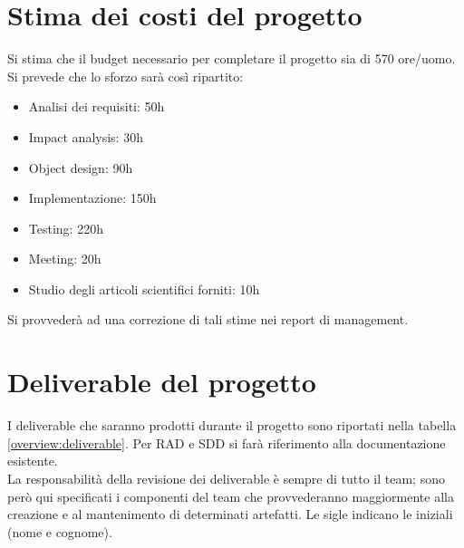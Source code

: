 \section{Stima dei costi del progetto}
Si stima che il budget necessario per completare il progetto sia di 570 ore/uomo. Si prevede che lo sforzo sarà così ripartito:\\
\begin{itemize}
\item Analisi dei requisiti: 50h
\item Impact analysis: 30h
\item Object design: 90h
\item Implementazione: 150h
\item Testing: 220h
\item Meeting: 20h
\item Studio degli articoli scientifici forniti: 10h
\end{itemize}

Si provvederà ad una correzione di tali stime nei report di management.

\section{Deliverable del progetto}
I deliverable che saranno prodotti durante il progetto sono riportati nella tabella \ref{overview:deliverable}. Per RAD e SDD si farà riferimento alla documentazione esistente.\\
La responsabilità della revisione dei deliverable è sempre di tutto il team; sono però qui specificati i componenti del team che provvederanno maggiormente alla creazione e al mantenimento di determinati artefatti. Le sigle indicano le iniziali (nome e cognome).

